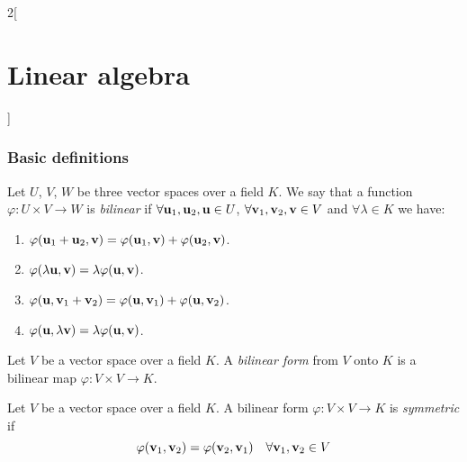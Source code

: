 \documentclass[../../../main_math.tex]{subfiles}
\begin{document}
\begin{multicols}{2}[\section{Linear algebra}]
  \subsubsection{Basic definitions}
  \begin{definition}
    Let $U$, $V$, $W$ be three vector spaces over a field $K$. We say that a function $\varphi:U\times V\rightarrow W$ is \emph{bilinear} if $\forall\boldsymbol{\mathrm{u}}_1,\boldsymbol{\mathrm{u}}_2,\boldsymbol{\mathrm{u}}\in U$, $\forall \boldsymbol{\mathrm{v}}_1,\boldsymbol{\mathrm{v}}_2,\boldsymbol{\mathrm{v}}\in V$ and $\forall\lambda\in K$ we have:
    \begin{enumerate}
      \item $\varphi(\boldsymbol{\mathrm{u}}_1+\boldsymbol{\mathrm{u}}_2,\boldsymbol{\mathrm{v}})=\varphi(\boldsymbol{\mathrm{u}}_1,\boldsymbol{\mathrm{v}})+\varphi(\boldsymbol{\mathrm{u}}_2,\boldsymbol{\mathrm{v}})$.
      \item $\varphi(\lambda \boldsymbol{\mathrm{u}},\boldsymbol{\mathrm{v}})=\lambda \varphi(\boldsymbol{\mathrm{u}},\boldsymbol{\mathrm{v}})$.
      \item $\varphi(\boldsymbol{\mathrm{u}},\boldsymbol{\mathrm{v}}_1+\boldsymbol{\mathrm{v}}_2)=\varphi(\boldsymbol{\mathrm{u}},\boldsymbol{\mathrm{v}}_1)+\varphi(\boldsymbol{\mathrm{u}},\boldsymbol{\mathrm{v}}_2)$.
      \item $\varphi(\boldsymbol{\mathrm{u}},\lambda \boldsymbol{\mathrm{v}})=\lambda \varphi(\boldsymbol{\mathrm{u}},\boldsymbol{\mathrm{v}})$.
    \end{enumerate}
  \end{definition}
  \begin{definition}
    Let $V$ be a vector space over a field $K$. A \emph{bilinear form} from $V$ onto $K$ is a bilinear map $\varphi:V\times V\rightarrow K$.
  \end{definition}
  \begin{definition}
    Let $V$ be a vector space over a field $K$. A bilinear form $\varphi:V\times V\rightarrow K$ is \emph{symmetric} if $$\varphi(\boldsymbol{\mathrm{v}}_1,\boldsymbol{\mathrm{v}}_2)=\varphi(\boldsymbol{\mathrm{v}}_2,\boldsymbol{\mathrm{v}}_1)\quad\forall \boldsymbol{\mathrm{v}}_1,\boldsymbol{\mathrm{v}}_2\in V$$
  \end{definition}

\end{multicols}
\end{document}
